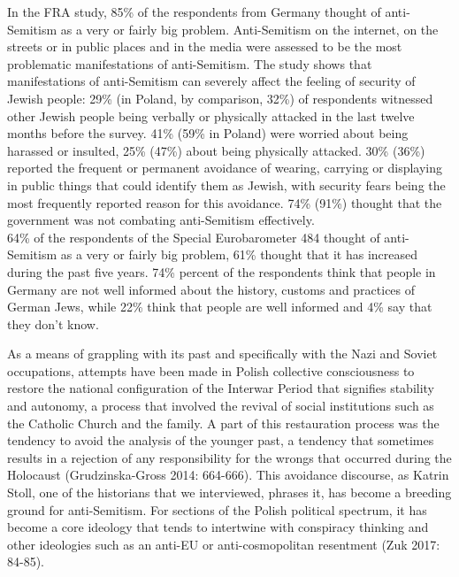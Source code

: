 In the FRA study, 85\% of the respondents from Germany thought of anti-Semitism as a very or fairly big problem. Anti-Semitism on the internet, on the streets or in public places and in the media were assessed to be the most problematic manifestations of anti-Semitism. The study shows that manifestations of anti-Semitism can severely affect the feeling of security of Jewish people: 29\% (in Poland, by comparison, 32\%) of respondents witnessed other Jewish people being verbally or physically attacked in the last twelve months before the survey. 41\% (59\% in Poland) were worried about being harassed or insulted, 25\% (47\%) about being physically attacked. 30\% (36\%) reported the frequent or permanent avoidance of wearing, carrying or displaying in public things that could identify them as Jewish, with security fears being the most frequently reported reason for this avoidance. 74\% (91\%) thought that the government was not combating anti-Semitism effectively.\\  
64\% of the respondents of the Special Eurobarometer 484 thought of anti-Semitism as a very or fairly big problem, 61\% thought that it has increased during the past five years. 74\% percent of the respondents think that people in Germany are not well informed about the history, customs and practices of German Jews, while 22\% think that people are well informed and 4\% say that they don't know. \par
As a means of grappling with its past and specifically with the Nazi and Soviet occupations, attempts have been made in Polish collective consciousness to restore the national configuration of the Interwar Period that signifies stability and autonomy, a process that involved the revival of social institutions such as the Catholic Church and the family. A part of this restauration process was the tendency to avoid the analysis of the younger past, a tendency that sometimes results in a rejection of any responsibility for the wrongs that occurred during the Holocaust (Grudzinska-Gross 2014: 664-666). This avoidance discourse, as Katrin Stoll, one of the historians that we interviewed, phrases it, has become a breeding ground for anti-Semitism. For sections of the Polish political spectrum, it has become a core ideology that tends to intertwine with conspiracy thinking and other ideologies such as an anti-EU or anti-cosmopolitan resentment (Zuk 2017: 84-85). \\
